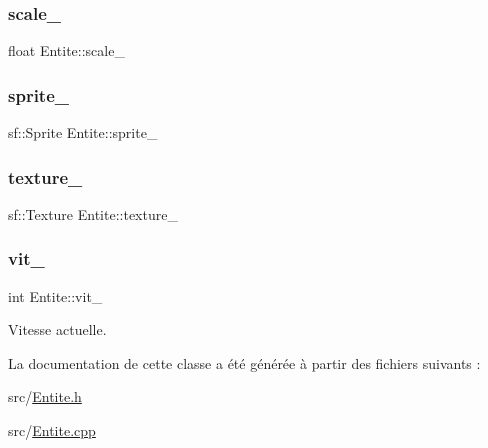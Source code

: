 \subsubsection{\texorpdfstring{scale\+\_\+}{scale\_}}
{\footnotesize\ttfamily float Entite\+::scale\+\_\+\hspace{0.3cm}{\ttfamily [protected]}}

\mbox{\label{class_entite_ab7c03b6fe5c4f1d08cd3e4304e0ef7c0}} 
\subsubsection{\texorpdfstring{sprite\+\_\+}{sprite\_}}
{\footnotesize\ttfamily sf\+::\+Sprite Entite\+::sprite\+\_\+\hspace{0.3cm}{\ttfamily [protected]}}

\mbox{\label{class_entite_a8147b9459318a9b1de1b72dce115680a}} 
\subsubsection{\texorpdfstring{texture\+\_\+}{texture\_}}
{\footnotesize\ttfamily sf\+::\+Texture Entite\+::texture\+\_\+\hspace{0.3cm}{\ttfamily [protected]}}

\mbox{\label{class_entite_a62c3145096f707457d60306ea6729ed6}} 
\subsubsection{\texorpdfstring{vit\+\_\+}{vit\_}}
{\footnotesize\ttfamily int Entite\+::vit\+\_\+\hspace{0.3cm}{\ttfamily [protected]}}



Vitesse actuelle. 



La documentation de cette classe a été générée à partir des fichiers suivants \+:\begin{DoxyCompactItemize}
\item 
src/\hyperlink{_entite_8h}{Entite.\+h}\item 
src/\hyperlink{_entite_8cpp}{Entite.\+cpp}\end{DoxyCompactItemize}
